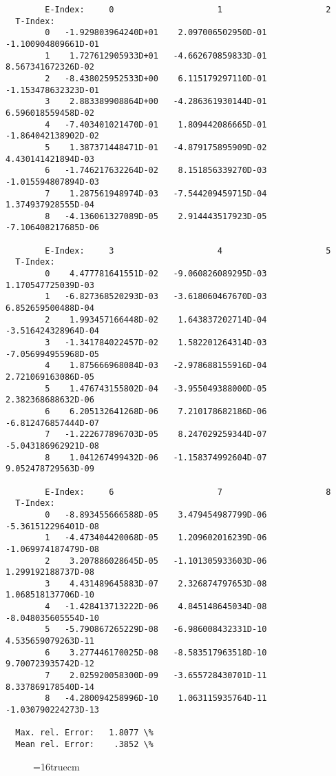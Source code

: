 \documentclass[12pt,dvipdfmx]{article}
\begin{document}
\begin{small}\begin{verbatim}
        E-Index:     0                     1                     2
  T-Index:
        0   -1.929803964240D+01    2.097006502950D-01   -1.100904809661D-01
        1    1.727612905933D+01   -4.662670859833D-01    8.567341672326D-02
        2   -8.438025952533D+00    6.115179297110D-01   -1.153478632323D-01
        3    2.883389908864D+00   -4.286361930144D-01    6.596018559458D-02
        4   -7.403401021470D-01    1.809442086665D-01   -1.864042138902D-02
        5    1.387371448471D-01   -4.879175895909D-02    4.430141421894D-03
        6   -1.746217632264D-02    8.151856339270D-03   -1.015594807894D-03
        7    1.287561948974D-03   -7.544209459715D-04    1.374937928555D-04
        8   -4.136061327089D-05    2.914443517923D-05   -7.106408217685D-06

        E-Index:     3                     4                     5
  T-Index:
        0    4.477781641551D-02   -9.060826089295D-03    1.170547725039D-03
        1   -6.827368520293D-03   -3.618060467670D-03    6.852659500488D-04
        2    1.993457166448D-02    1.643837202714D-04   -3.516424328964D-04
        3   -1.341784022457D-02    1.582201264314D-03   -7.056994955968D-05
        4    1.875666968084D-03   -2.978688155916D-04    2.721069163086D-05
        5    1.476743155802D-04   -3.955049388000D-05    2.382368688632D-06
        6    6.205132641268D-06    7.210178682186D-06   -6.812476857444D-07
        7   -1.222677896703D-05    8.247029259344D-07   -5.043186962921D-08
        8    1.041267499432D-06   -1.158374992604D-07    9.052478729563D-09

        E-Index:     6                     7                     8
  T-Index:
        0   -8.893455666588D-05    3.479454987799D-06   -5.361512296401D-08
        1   -4.473404420068D-05    1.209602016239D-06   -1.069974187479D-08
        2    3.207886028645D-05   -1.101305933603D-06    1.299192188737D-08
        3    4.431489645883D-07    2.326874797653D-08    1.068518137706D-10
        4   -1.428413713222D-06    4.845148645034D-08   -8.048035605554D-10
        5   -5.790867265229D-08   -6.986008432331D-10    4.535659079263D-11
        6    3.277446170025D-08   -8.583517963518D-10    9.700723935742D-12
        7    2.025920058300D-09   -3.655728430701D-11    8.337869178540D-14
        8   -4.280094258996D-10    1.063115935764D-11   -1.030790224273D-13

  Max. rel. Error:   1.8077 \%
  Mean rel. Error:    .3852 \%

\end{verbatim}\end{small}
\begin{figure} \label{h12_2.0a}
\epsfxsize=16truecm
\end{figure}
\end{document}
